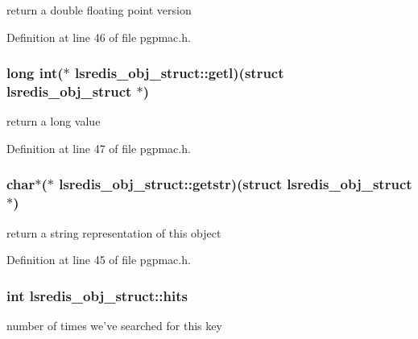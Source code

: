 return a double floating point version 



Definition at line 46 of file pgpmac.\-h.

\hypertarget{structlsredis__obj__struct_abcb9459a7d8edabaf8ff4e9f1a96aba7}{
\subsubsection[{getl}]{\setlength{\rightskip}{0pt plus 5cm}long int($\ast$ lsredis\-\_\-obj\-\_\-struct\-::getl)(struct {\bf lsredis\-\_\-obj\-\_\-struct} $\ast$)}}\label{structlsredis__obj__struct_abcb9459a7d8edabaf8ff4e9f1a96aba7}


return a long value 



Definition at line 47 of file pgpmac.\-h.

\hypertarget{structlsredis__obj__struct_aa61ab86f719e093af48810a3bd37b739}{
\subsubsection[{getstr}]{\setlength{\rightskip}{0pt plus 5cm}char$\ast$($\ast$ lsredis\-\_\-obj\-\_\-struct\-::getstr)(struct {\bf lsredis\-\_\-obj\-\_\-struct} $\ast$)}}\label{structlsredis__obj__struct_aa61ab86f719e093af48810a3bd37b739}


return a string representation of this object 



Definition at line 45 of file pgpmac.\-h.

\hypertarget{structlsredis__obj__struct_a43fcbff584654ab086d973ce34cb6ddc}{
\subsubsection[{hits}]{\setlength{\rightskip}{0pt plus 5cm}int lsredis\-\_\-obj\-\_\-struct\-::hits}}\label{structlsredis__obj__struct_a43fcbff584654ab086d973ce34cb6ddc}


number of times we've searched for this key 



